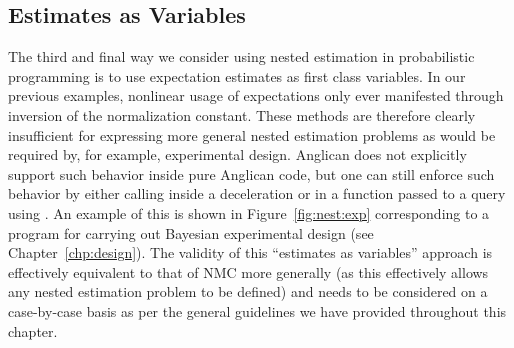 \subsection{Estimates as Variables}
\label{sec:nest:imp:expt}

The third and final way we consider using nested estimation in probabilistic programming
is to use expectation estimates as first class variables.  In our previous examples,
nonlinear usage of expectations only ever manifested through inversion of the normalization
constant.  These methods are therefore clearly insufficient for expressing more general
nested estimation problems as would be required by, for example, experimental design.
Anglican does not explicitly support such behavior inside pure Anglican code, but 
one can still enforce such
behavior by either calling \doquery inside a  deceleration or in a  function
passed to a query using .  An example of this is shown
in Figure~\ref{fig:nest:exp} corresponding to a program for carrying out Bayesian experimental
design (see Chapter~\ref{chp:design}).  The validity of this ``estimates as variables'' 
approach is effectively
equivalent to that of NMC more generally (as this effectively allows any nested estimation
problem to be defined) and needs to be considered on a case-by-case basis as per
the general guidelines we have provided throughout this chapter.


